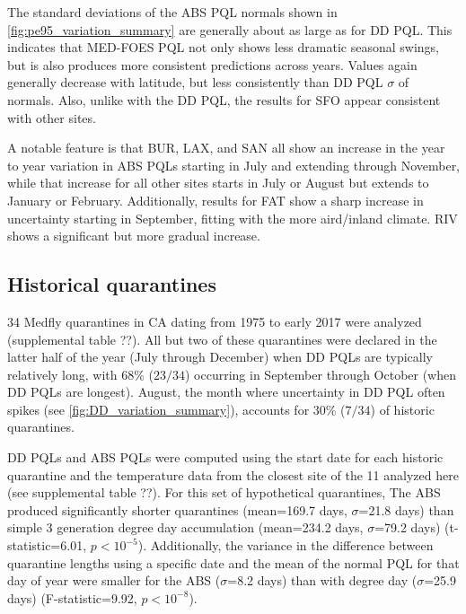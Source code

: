 \documentclass[10pt,a4paper,twocolumn]{article}
\begin{document}
The standard deviations of the ABS PQL normals 
shown in \autoref{fig:pe95_variation_summary}
are generally about  as large as for DD PQL.
This indicates that MED-FOES PQL not only shows less dramatic seasonal swings, 
but is also produces more consistent predictions across years.
Values again generally decrease with latitude, but less consistently than DD PQL $\sigma$ of normals.
Also, unlike with the DD PQL, the results for SFO appear consistent with other sites.

A notable feature is that BUR, LAX, and SAN all show an increase in the year to year variation
in ABS PQLs starting in July and extending through November, 
while that increase for all other sites starts in July or August 
but extends to January or February.
Additionally, results for FAT show a sharp increase in uncertainty starting in September, fitting with the 
more aird/inland climate.  RIV shows a significant but more gradual increase.

\subsection*{Historical quarantines}

34 Medfly quarantines in CA dating from 1975 to early 2017 were analyzed (supplemental table ??).
All but two of these quarantines were declared in the latter half of the year
(July through December) when DD PQLs are typically relatively long,
with 68\% ($23/34$) occurring in September through October (when DD PQLs are
longest). 
August, the month where uncertainty in DD PQL often spikes 
(see \autoref{fig:DD_variation_summary}), 
accounts for 30\% ($7/34$) of historic quarantines.

DD PQLs and ABS PQLs were computed using the start date for each historic
quarantine and the temperature data from the closest site of the 11 analyzed
here (see supplemental table ??).
For this set of hypothetical quarantines, 
The ABS produced significantly shorter quarantines
(mean=169.7 days, $\sigma$=21.8 days)
than simple 3 generation degree day accumulation
(mean=234.2 days, $\sigma$=79.2 days)
(t-statistic=6.01, $p<10^{-5}$).
Additionally, the variance in the difference between quarantine lengths
using a specific date and the mean of the normal PQL for that day of year
were smaller for the ABS ($\sigma$=8.2 days)
than with degree day ($\sigma$=25.9 days)
(F-statistic=9.92, $p<10^{-8}$).
\end{document}
